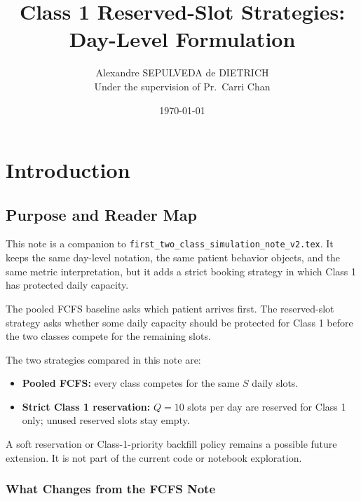 \documentclass[11pt]{article}
\title{Class 1 Reserved-Slot Strategies: Day-Level Formulation}
\author{Alexandre SEPULVEDA de DIETRICH\\Under the supervision of Pr.~Carri Chan}
\date{\today}
\begin{document}
\maketitle
\setcounter{tocdepth}{3}
\tableofcontents
\bigskip

\section{Introduction}

\subsection{Purpose and Reader Map}

This note is a companion to \texttt{first\_two\_class\_simulation\_note\_v2.tex}. It keeps the same
day-level notation, the same patient behavior objects, and the same metric interpretation, but it
adds a strict booking strategy in which Class 1 has protected daily capacity.

\begin{keybox}[title={Core Policy Question}]
The pooled FCFS baseline asks which patient arrives first. The reserved-slot strategy asks whether
some daily capacity should be protected for Class 1 before the two classes compete for the remaining
slots.
\end{keybox}

The two strategies compared in this note are:
\begin{itemize}[nosep]
    \item \textbf{Pooled FCFS:} every class competes for the same \(S\) daily slots.
    \item \textbf{Strict Class 1 reservation:} \(Q=10\) slots per day are reserved for Class 1 only; unused reserved slots stay empty.
\end{itemize}

\begin{keybox}[title={Future Focus: Soft Reservation}]
A soft reservation or Class-1-priority backfill policy remains a possible future extension. It is not
part of the current code or notebook exploration.
\end{keybox}

\subsubsection{What Changes from the FCFS Note}
\end{document}
